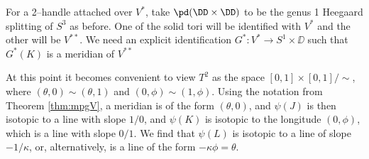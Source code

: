 	For a 2--handle attached over $V^*$, take $\pd (\DD\times\DD)$ to be the genus 1 Heegaard splitting of $S^3$ as before.
	One of the solid tori will be identified with $V^*$ and the other will be $V^{**}$.
	We need an explicit identification $G^*:V^*\to S^1\times\DD$ such that $G^*(K)$ is a meridian of $V^{**}$
	
	At this point it becomes convenient to view $T^2$ as the space $[0,1]\times[0,1]/\sim$, where $(\theta,0)\sim(\theta,1)$ and $(0,\phi)\sim(1,\phi)$.
	Using the notation from Theorem \ref{thm:mpgV}, a meridian is of the form $(\theta,0)$, and $\psi(J)$ is then isotopic to a line with slope $1/0$, and $\psi(K)$ is isotopic to the longitude $(0,\phi)$, which is a line with slope $0/1$.
	We find that $\psi(L)$ is isotopic to a line of slope $-1/\kappa$, or, alternatively, is a line of the form $-\kappa\phi=\theta$.
